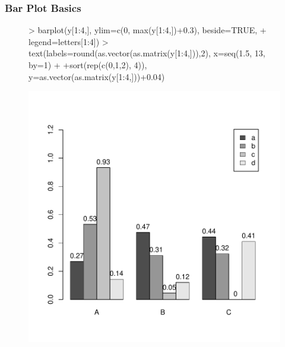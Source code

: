 \documentclass{beamer}
\begin{document}
\begin{frame}[containsverbatim]  
	\frametitle{Bar Plot Basics}
\scriptsize
\begin{figure}
  \centering
\begin{Schunk}
\begin{Sinput}
> barplot(y[1:4,], ylim=c(0, max(y[1:4,])+0.3), beside=TRUE, 
+         legend=letters[1:4]) 
> text(labels=round(as.vector(as.matrix(y[1:4,])),2), x=seq(1.5, 13, by=1)
+      +sort(rep(c(0,1,2), 4)), y=as.vector(as.matrix(y[1:4,]))+0.04) 
\end{Sinput}
\end{Schunk}
\includegraphics{fig--014}
\label{fig:bar_plot1}
\end{figure}
\end{frame}
\end{document}
